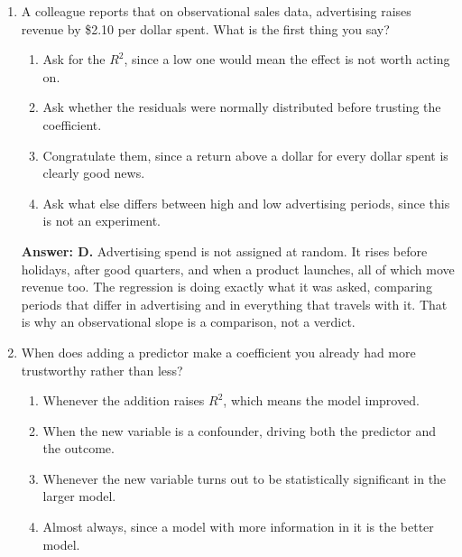 \documentclass[11pt]{article}
\begin{document}
\begin{enumerate}[itemsep=14pt]
\vspace{2pt}
\textbf{Answer: A.} Residuals should look like a shapeless cloud. Structure left in them is structure the model failed to capture, and a U says specifically that the true relationship curves. Adding a squared term or transforming the predictor usually fixes it. This is not an outlier problem, and it is not mainly about normality.
\vspace{4pt}

\item A colleague reports that on observational sales data, advertising raises revenue by \$2.10 per dollar spent. What is the first thing you say?

\begin{enumerate}[label=\Alph*., itemsep=1pt, topsep=3pt]
  \item Ask for the $R^2$, since a low one would mean the effect is not worth acting on.
  \item Ask whether the residuals were normally distributed before trusting the coefficient.
  \item Congratulate them, since a return above a dollar for every dollar spent is clearly good news.
  \item Ask what else differs between high and low advertising periods, since this is not an experiment.
\end{enumerate}

\vspace{2pt}
\textbf{Answer: D.} Advertising spend is not assigned at random. It rises before holidays, after good quarters, and when a product launches, all of which move revenue too. The regression is doing exactly what it was asked, comparing periods that differ in advertising and in everything that travels with it. That is why an observational slope is a comparison, not a verdict.
\vspace{4pt}

\item When does adding a predictor make a coefficient you already had more trustworthy rather than less?

\begin{enumerate}[label=\Alph*., itemsep=1pt, topsep=3pt]
  \item Whenever the addition raises $R^2$, which means the model improved.
  \item When the new variable is a confounder, driving both the predictor and the outcome.
  \item Whenever the new variable turns out to be statistically significant in the larger model.
  \item Almost always, since a model with more information in it is the better model.
\end{enumerate}


\end{enumerate}
\end{document}
